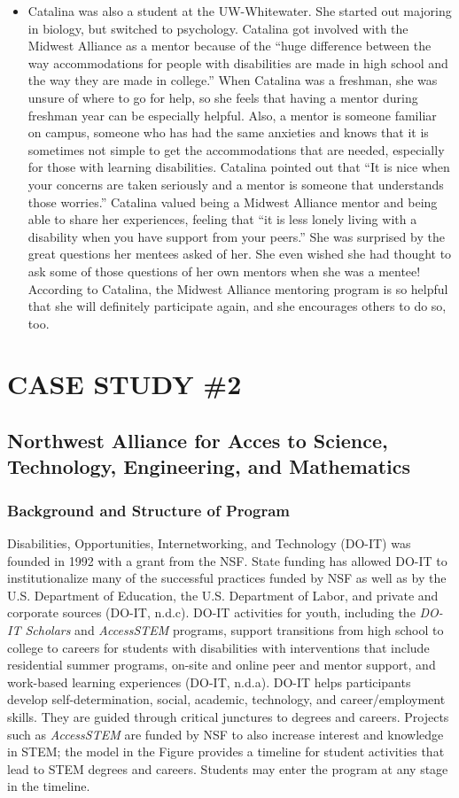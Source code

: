 \documentclass[11.5pt]{sig-alternate} %
\begin{document}
\begin{large}
\begin{itemize}
    \item Catalina was also a student at the UW-Whitewater. She started out majoring in biology, but switched to psychology. Catalina got involved with the Midwest Alliance as a mentor because of the “huge difference between the way accommodations for people with disabilities are made in high school and the way they are made in college.” When Catalina was a freshman, she was unsure of where to go for help, so she feels that having a mentor during freshman year can be especially helpful. Also, a mentor is someone familiar on campus, someone who has had the same anxieties and knows that it is sometimes not simple to get the accommodations that are needed, especially for those with learning disabilities. Catalina pointed out that “It is nice when your concerns are taken seriously and a mentor is someone that understands those worries.” Catalina valued being a Midwest Alliance mentor and being able to share her experiences, feeling that “it is less lonely living with a disability when you have support from your peers.” She was surprised by the great questions her mentees asked of her. She even wished she had thought to ask some of those questions of her own mentors when she was a mentee! According to Catalina, the Midwest Alliance mentoring program is so helpful that she will definitely participate again, and she encourages others to do so, too.
\end{itemize}

\section*{CASE STUDY \#2}
\subsection*{Northwest Alliance for Acces to Science, Technology, Engineering, and Mathematics}
\subsubsection*{Background and Structure of Program}
Disabilities, Opportunities, Internetworking, and Technology (DO-IT) was founded in 1992 with a grant from the NSF. State funding has allowed DO-IT to institutionalize many of the successful practices funded by NSF as well as by the U.S. Department of Education, the U.S. Department of Labor, and private and corporate sources (DO-IT, n.d.c). DO-IT activities for youth, including the \textit{DO-IT Scholars} and \textit{AccessSTEM} programs, support transitions from high school to college to careers for students with disabilities with interventions that include residential summer programs, on-site and online peer and mentor support, and work-based learning experiences (DO-IT, n.d.a). DO-IT helps participants develop self-determination, social, academic, technology, and career/employment skills. They are guided through critical junctures to degrees and careers. Projects such as \textit{AccessSTEM} are funded by NSF to also increase interest and knowledge in STEM; the model in the Figure provides a timeline for student activities that lead to STEM degrees and careers. Students may enter the program at any stage in the timeline.


\end{large}
\end{document}
